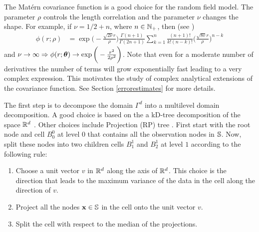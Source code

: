 \documentclass[11pt,final]{amsart}       %
\begin{document}
\begin{remark} The Mat\'{e}rn covariance function is a good choice for
the random field model. The parameter $\rho$ controls the length
correlation and the parameter $\nu$ changes the shape. For example, if
$\nu = 1/2 + n$, where $n \in \mathbb{N}_{+}$, then (see
\cite{abramowitz1964})
\[
\begin{split}
\phi(r;\rho) &= \exp   \bigg(-\frac{\sqrt{2\nu}r}{\rho} \bigg)
\frac{\Gamma(n + 1)}{\Gamma(2n + 1)} 
\sum_{k = 1}^{n} \frac{(n+1)!}{k!(n-k)!}
\bigg(
\frac{ \sqrt{8v} r }{ \rho } 
\bigg)^{n-k}
\end{split}
\]
and $\nu \rightarrow \infty \Rightarrow \phi(r;\boldsymbol{\theta}) \rightarrow
\exp \bigg(-\frac{r^2}{2\rho^2} \bigg)$. Note that even for a moderate
number of derivatives the number of terms will grow exponentially fast
leading to a very complex expression. This motivates the study of
complex analytical extensions of the covariance function. See Section
\ref{errorestimates} for more details.

\label{multilevelapproach:remark1}
\end{remark}
The first step is to decompose the domain $\Gamma^{d}$ into a
multilevel domain decomposition. A good choice is based on the a
kD-tree decomposition of the space $\Bbb{R}^{d}$ \cite{Dasgupta2008}.
Other choices include
Projection (RP) tree \cite{Dasgupta2008}.
First start with the root node and cell $B^{0}_{0}$ at level $0$ that
contains all the observation nodes in $\mathbb{S}$. Now, split these nodes
into two children cells $B^{1}_{1}$ and $B^{1}_{2}$ at level $1$
according to the following rule:
\begin{enumerate}

\item Choose a unit vector $v$ in $\Bbb{R}^{d}$ along the axis of
  $\Bbb{R}^{d}$. This choice is the direction that leads to the maximum
  variance of the data in the cell along the direction of $v$.

\item Project all the nodes $\mathbf{x} \in \mathbb{S}$ in the cell onto the unit
  vector $v$.

\item Split the cell with respect to the median
of the projections.

\end{enumerate}
\end{document}
